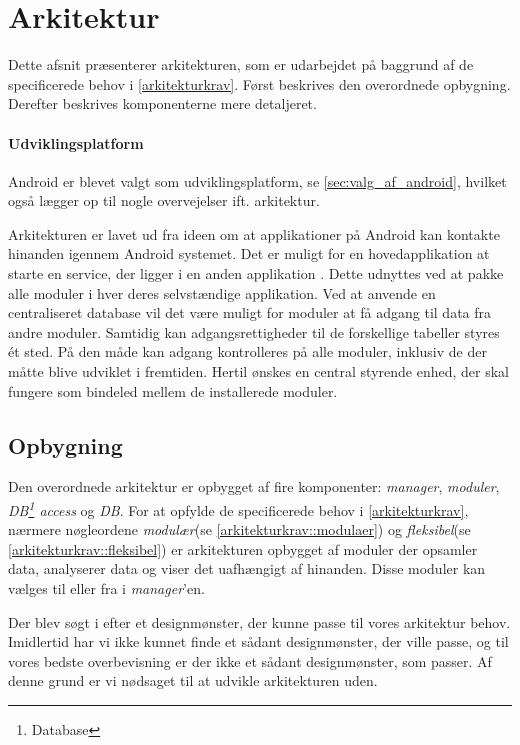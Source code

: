 \section{Arkitektur}\label{sec:arkitektur}
Dette afsnit præsenterer arkitekturen, som er udarbejdet på baggrund af de specificerede behov i \cref{arkitekturkrav}.
Først beskrives den overordnede opbygning.
Derefter beskrives komponenterne mere detaljeret.

\paragraph{Udviklingsplatform}
Android er blevet valgt som udviklingsplatform, se \cref{sec:valg_af_android}, hvilket også lægger op til nogle overvejelser ift. arkitektur.

Arkitekturen er lavet ud fra ideen om at applikationer på Android kan kontakte hinanden igennem Android systemet.
Det er muligt for en hovedapplikation at starte en service, der ligger i en anden applikation \citep{android_service}.
Dette udnyttes ved at pakke alle moduler i hver deres selvstændige applikation.
Ved at anvende en centraliseret database vil det være muligt for moduler at få adgang til data fra andre moduler.
Samtidig kan adgangsrettigheder til de forskellige tabeller styres ét sted.
På den måde kan adgang kontrolleres på alle moduler, inklusiv de der måtte blive udviklet i fremtiden.
Hertil ønskes en central styrende enhed, der skal fungere som bindeled mellem de installerede moduler.

\subsection{Opbygning}\label{arkitektur:opbygning}
Den overordnede arkitektur er opbygget af fire komponenter: \textit{manager}, \textit{moduler}, \textit{DB\footnote{Database} access} og \textit{DB}.
For at opfylde de specificerede behov i \cref{arkitekturkrav}, nærmere nøgleordene \textit{modulær}(se \cref{arkitekturkrav::modulaer}) og \textit{fleksibel}(se \cref{arkitekturkrav::fleksibel}) er arkitekturen opbygget af moduler der opsamler data, analyserer data og viser det uafhængigt af hinanden.
Disse moduler kan vælges til eller fra i \textit{manager}'en.

Der blev søgt i \citet{gamma1994design} efter et designmønster, der kunne passe til vores arkitektur behov.
Imidlertid har vi ikke kunnet finde et sådant designmønster, der ville passe, og til vores bedste overbevisning er der ikke et sådant designmønster, som passer.
Af denne grund er vi nødsaget til at udvikle arkitekturen uden.

